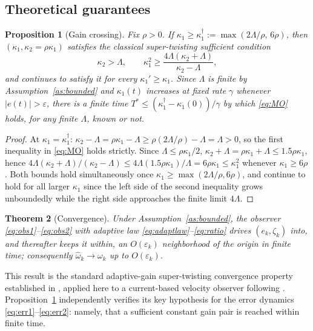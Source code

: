 \documentclass[letterpaper, 10 pt, conference]{ieeeconf}
\newtheorem{theorem}{Theorem}[section]
\newtheorem{proposition}[theorem]{Proposition}
\begin{document}
\subsection{Theoretical guarantees}
\begin{proposition}[Gain crossing]
\label{prop:crossing}
Fix $\rho>0$. If $\kappa_1\ge\kappa_1^\dagger:=\max(2\Lambda/\rho,\,6\rho)$, then $(\kappa_1,\kappa_2{=}\rho\kappa_1)$ satisfies the classical super-twisting sufficient condition \cite{Moreno2012}
\begin{equation}
\kappa_2>\Lambda, \qquad \kappa_1^2 \ge \frac{4\Lambda(\kappa_2+\Lambda)}{\kappa_2-\Lambda},
\label{eq:MO}
\end{equation}
and continues to satisfy it for every $\kappa_1'\ge\kappa_1$. Since $\Lambda$ is finite by Assumption~\ref{as:bounded} and $\kappa_1(t)$ increases at fixed rate $\gamma$ whenever $|e(t)|>\varepsilon$, there is a finite time $T^\ast\le(\kappa_1^\dagger-\kappa_1(0))/\gamma$ by which \eqref{eq:MO} holds, for any finite $\Lambda$, known or not.
\end{proposition}
\begin{proof}
At $\kappa_1=\kappa_1^\dagger$: $\kappa_2-\Lambda=\rho\kappa_1-\Lambda\ge\rho(2\Lambda/\rho)-\Lambda=\Lambda>0$, so the first inequality in \eqref{eq:MO} holds strictly. Since $\Lambda\le\rho\kappa_1/2$, $\kappa_2+\Lambda=\rho\kappa_1+\Lambda\le1.5\rho\kappa_1$, hence
$4\Lambda(\kappa_2+\Lambda)/(\kappa_2-\Lambda)\le4\Lambda(1.5\rho\kappa_1)/\Lambda=6\rho\kappa_1\le\kappa_1^2$
whenever $\kappa_1\ge6\rho$. Both bounds hold simultaneously once $\kappa_1\ge\max(2\Lambda/\rho,6\rho)$, and continue to hold for all larger $\kappa_1$ since the left side of the second inequality grows unboundedly while the right side approaches the finite limit $4\Lambda$.
\end{proof}

\begin{theorem}[Convergence]
\label{thm:convergence}
Under Assumption~\ref{as:bounded}, the observer \eqref{eq:obs1}--\eqref{eq:obs2} with adaptive law \eqref{eq:adaptlaw}--\eqref{eq:ratio} drives $(e_k,\zeta_k)$ into, and thereafter keeps it within, an $O(\varepsilon_k)$ neighborhood of the origin in finite time; consequently $\hat\omega_k\to\omega_k$ up to $O(\varepsilon_k)$.
\end{theorem}
This result is the standard adaptive-gain super-twisting convergence property established in \cite{Plestan2010,Shtessel2012}, applied here to a current-based velocity observer following \cite{Bahrami2020}. Proposition~\ref{prop:crossing} independently verifies its key hypothesis for the error dynamics \eqref{eq:err1}--\eqref{eq:err2}: namely, that a sufficient constant gain pair is reached within finite time.
\end{document}
